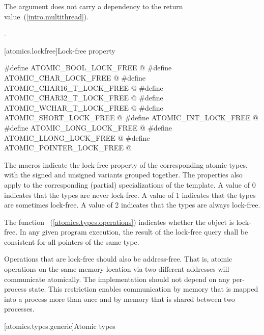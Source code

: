 \begin{itemdescr}
\pnum
\effects The argument does not carry a dependency to the return
value~(\ref{intro.multithread}).

\pnum
\returns {}.
\end{itemdescr}


[atomics.lockfree]{Lock-free property}

\begin{codeblock}
#define ATOMIC_BOOL_LOCK_FREE @\unspec@
#define ATOMIC_CHAR_LOCK_FREE @\unspec@
#define ATOMIC_CHAR16_T_LOCK_FREE @\unspec@
#define ATOMIC_CHAR32_T_LOCK_FREE @\unspec@
#define ATOMIC_WCHAR_T_LOCK_FREE @\unspec@
#define ATOMIC_SHORT_LOCK_FREE @\unspec@
#define ATOMIC_INT_LOCK_FREE @\unspec@
#define ATOMIC_LONG_LOCK_FREE @\unspec@
#define ATOMIC_LLONG_LOCK_FREE @\unspec@
#define ATOMIC_POINTER_LOCK_FREE @\unspec@
\end{codeblock}

\pnum
The  macros indicate the lock-free property of the
corresponding atomic types, with the signed and unsigned variants grouped
together. The properties also apply to the corresponding (partial) specializations of the
 template. A value of 0 indicates that the types are never
lock-free. A value of 1 indicates that the types are sometimes lock-free. A
value of 2 indicates that the types are always lock-free.

\pnum
The function ~(\ref{atomics.types.operations})
indicates whether the object is lock-free. In any given program execution, the
result of the lock-free query shall be consistent for all pointers of the same
type.

\pnum
\begin{note} Operations that are lock-free should also be address-free. That is,
atomic operations on the same memory location via two different addresses will
communicate atomically. The implementation should not depend on any
per-process state. This restriction enables communication  by memory that is
mapped into a process more than once and by memory that is shared between two
processes. \end{note}

[atomics.types.generic]{Atomic types}

